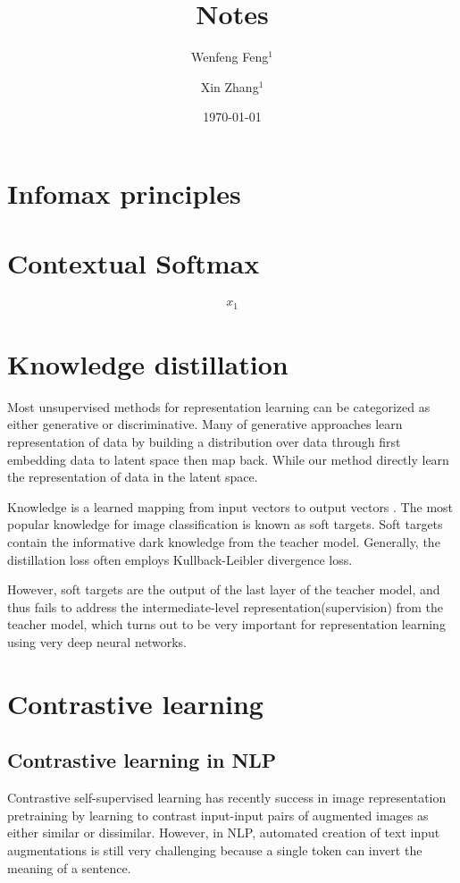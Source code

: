 \documentclass[a4paper]{article}
\title{
	Notes
	}
\author{Wenfeng Feng$^1$ \and Xin Zhang$^1$}
\date{
	\today
}
\begin{document}
	\maketitle
	

	\tableofcontents
	
	\section{Infomax principles}
	
	\section{Contextual Softmax}
	\begin{align}
		x_1
	\end{align}


	\section{Knowledge distillation}
	Most unsupervised methods for representation learning can be categorized as either generative or discriminative.
	Many of generative approaches learn representation of data by building a distribution over data through first embedding data to latent space then map back.
	While our method directly learn the representation of data in the latent space.

	Knowledge is a learned mapping from input vectors to output vectors \cite{hinton2015distilling} .
	The most popular knowledge for image classification is known as soft targets. 
	Soft targets contain the informative dark knowledge from the teacher model.
	Generally, the distillation loss often employs Kullback-Leibler divergence loss.

	However, soft targets are the output of the last layer of the teacher model, and thus fails to address the intermediate-level representation(supervision) from the teacher model, which turns out to be very important for representation learning using very deep neural networks.
	
	\section{Contrastive learning}
	\subsection{Contrastive learning in NLP}
	\cite{rethmeier2021primer}
	Contrastive self-supervised learning has recently success in image representation pretraining by learning to contrast input-input pairs of augmented images as either similar or dissimilar.
	However, in NLP, automated creation of text input augmentations is still very challenging because a single token can invert the meaning of a sentence.
	
\end{document}

